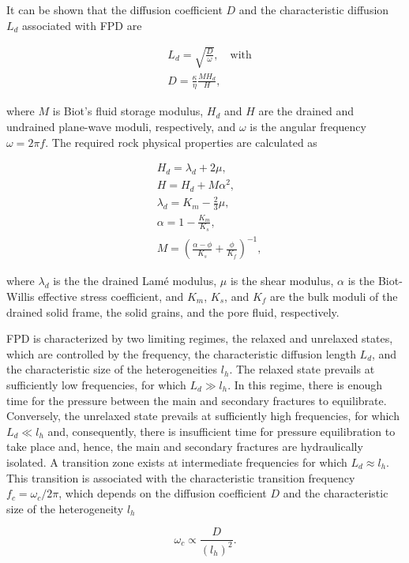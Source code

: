 \documentclass[draft]{agujournal2019}
\begin{document}
It can be shown that the diffusion coefficient $D$ and the characteristic diffusion $L_d$ associated with FPD are \cite{Chandler1981, Norris1993}
\begin{linenomath*}
\begin{equation}\label{Eq.3}
\begin{split}
&L_d=\sqrt{\frac{D}{\omega}},\quad \text{with} \\
&D= \frac {\kappa} {\eta} \frac{M H_d}{H},
\end{split}
\end{equation}
\end{linenomath*}
where $M$ is Biot’s fluid storage modulus, $H_d$ and $H$ are the drained and undrained plane-wave moduli, respectively, and $\omega$ is the angular frequency $\omega = 2 \pi f$.        
The required rock physical properties are calculated as
\begin{linenomath*}
\begin{equation}\label{Eq.4}
\begin{split}
& H_d = \lambda_d + 2 \mu, \\
& H = H_d + M \alpha ^2, \\
& \lambda_d= K_m - \frac{2}{3} \mu, \\
& \alpha =1-\frac{K_m}{K_s},\\
& M  =\left( \frac{\alpha-\phi}{K_s} +\frac{\phi}{K_f} \right)^{-1},
\end{split}
\end{equation}
\end{linenomath*}
where $\lambda_d$ is the the drained Lamé modulus, $\mu$ is the shear modulus, $\alpha$ is the Biot-Willis effective stress coefficient, and  $K_m$, $K_s$, and $K_f$ are the bulk moduli of the drained solid frame, the solid grains, and the pore fluid, respectively.

FPD is characterized by two limiting regimes, the relaxed and unrelaxed states, which are controlled by the frequency, the characteristic diffusion length $L_d$, and the characteristic size of the heterogeneities $l_h$.
The relaxed state prevails at sufficiently low frequencies, for which  $L_d \gg l_h$. In this regime, there is enough time for the pressure between the main and secondary fractures to equilibrate. Conversely, the unrelaxed state prevails at sufficiently high frequencies, for which $L_d \ll l_h$ and, consequently, there is insufficient time for pressure equilibration to take place and, hence, the main and secondary fractures are hydraulically isolated. A transition zone exists at intermediate frequencies for which $L_d \approx l_h$.
This transition is associated with the characteristic transition frequency $f_c= \omega_c/2\pi$, 
which depends on the diffusion coefficient $D$ and the characteristic size of the heterogeneity $l_h$ \cite{Rubino2014}
\begin{linenomath*}
\begin{equation}\label{Eq.5}
\omega_c \propto \frac{D}{(l_h)^2}.
\end{equation}
\end{linenomath*}
\end{document}

